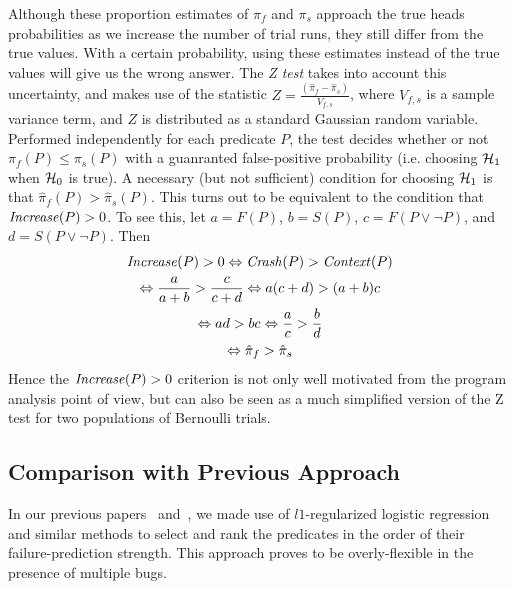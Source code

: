 Although these proportion estimates of $\pi_f$ and $\pi_s$ approach the
true heads probabilities as we increase the number of trial runs, they
still differ from the true values.  With a certain probability, using these
estimates instead of the true values will give us the wrong
answer.  The \textit{Z test} takes into account this uncertainty, and
makes use of the statistic $ Z = \frac{(\hat \pi_f - \hat
  \pi_s)}{V_{f,s}}$, where $V_{f,s}$ is a sample variance term, and $Z$
is distributed as a standard Gaussian random
variable.  Performed independently for each predicate $P$, the test
decides whether or not $\pi_f(P) \leq \pi_s(P)$ with a guanranted
false-positive probability (i.e. choosing ${\mathcal{H}}_1$ when ${\mathcal{H}}_0$ is true).
A necessary (but not sufficient) condition for choosing ${\mathcal{H}}_1$ is that
$\hat \pi_f(P) > \hat \pi_s(P)$.  This turns out to be
equivalent to the condition that $\mbox{\textit{Increase}}(P) > 0$.  To see this,
let $a = F(P)$, $b = S(P)$, $c = F(P\lor\lnot P)$, and $d = S(P\lor\lnot P)$.
Then
\begin{gather*}
  \mbox{\textit{Increase}}(P) > 0 \Leftrightarrow \mbox{\textit{Crash}}(P) > \mbox{\textit{Context}}(P) \\
  \Leftrightarrow \frac{a}{a+b} > \frac{c}{c+d}
  \Leftrightarrow a (c+d) > (a+b) c \\
  \Leftrightarrow ad > bc \Leftrightarrow \frac{a}{c} > \frac{b}{d} \\
  \Leftrightarrow \hat \pi_f > \hat \pi_s
\end{gather*}
Hence the $\mbox{\textit{Increase}}(P) > 0$ criterion is not only well motivated
from the program analysis point of view, but can also be seen as a much
simplified version of the Z test for two populations of
Bernoulli trials.

\subsection{Comparison with Previous Approach}
In our previous papers~\cite{Zheng:2003:SDSP} and~\cite{PLDI`03*141},
we made use of $l1$-regularized logistic regression and similar
methods to select and rank the predicates in the order of their
failure-prediction strength.  This approach proves to be
overly-flexible in the presence of multiple bugs.

